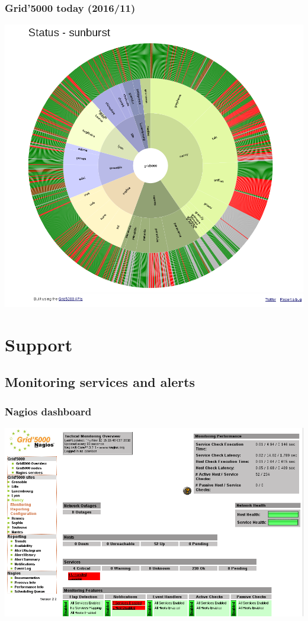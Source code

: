 \documentclass[11pt,compress]{beamer}
\begin{document}
\begin{frame}
\frametitle{Grid'5000 today (2016/11)}
\begin{center}
\includegraphics[scale=0.19]{figures/sunburst}
\end{center}
\end{frame}

\section{Support}
\subsection{Monitoring services and alerts}
\begin{frame}
\frametitle{Nagios dashboard}
\begin{center}
\includegraphics[scale=0.29]{figures/nagios}
\end{center}
\end{frame}
\end{document}
